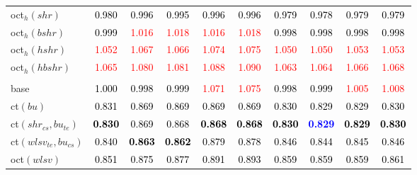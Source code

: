 \begin{tabular}[t]{>{\centering\arraybackslash}m{2.5cm}ccccccccc}
oct$_h(shr)$ & \textcolor{black}{0.980} & \textcolor{black}{0.996} & \textcolor{black}{0.995} & \textcolor{black}{0.996} & \textcolor{black}{0.996} & \textcolor{black}{0.979} & \textcolor{black}{0.978} & \textcolor{black}{0.979} & \textcolor{black}{0.979}\\
oct$_h(bshr)$ & \textcolor{black}{0.999} & \textcolor{red}{1.016} & \textcolor{red}{1.018} & \textcolor{red}{1.016} & \textcolor{red}{1.018} & \textcolor{black}{0.998} & \textcolor{black}{0.998} & \textcolor{black}{0.998} & \textcolor{black}{0.998}\\
oct$_h(hshr)$ & \textcolor{red}{1.052} & \textcolor{red}{1.067} & \textcolor{red}{1.066} & \textcolor{red}{1.074} & \textcolor{red}{1.075} & \textcolor{red}{1.050} & \textcolor{red}{1.050} & \textcolor{red}{1.053} & \textcolor{red}{1.053}\\
oct$_h(hbshr)$ & \textcolor{red}{1.065} & \textcolor{red}{1.080} & \textcolor{red}{1.081} & \textcolor{red}{1.088} & \textcolor{red}{1.090} & \textcolor{red}{1.063} & \textcolor{red}{1.064} & \textcolor{red}{1.066} & \textcolor{red}{1.068}\\
\addlinespace[0.3em]
\multicolumn{10}{c}{\textbf{$k = 2$}}\\
base & \textcolor{black}{1.000} & \textcolor{black}{0.998} & \textcolor{black}{0.999} & \textcolor{red}{1.071} & \textcolor{red}{1.075} & \textcolor{black}{0.998} & \textcolor{black}{0.999} & \textcolor{red}{1.005} & \textcolor{red}{1.008}\\
ct$(bu)$ & \textcolor{black}{0.831} & \textcolor{black}{0.869} & \textcolor{black}{0.869} & \textcolor{black}{0.869} & \textcolor{black}{0.869} & \textcolor{black}{0.830} & \textcolor{black}{0.829} & \textcolor{black}{0.829} & \textcolor{black}{0.830}\\
ct$(shr_{cs}, bu_{te})$ & \textcolor{black}{\textbf{0.830}} & \textcolor{black}{0.869} & \textcolor{black}{0.868} & \textcolor{black}{\textbf{0.868}} & \textcolor{black}{\textbf{0.868}} & \textcolor{black}{\textbf{0.830}} & \textcolor{blue}{\textbf{0.829}} & \textcolor{black}{\textbf{0.829}} & \textcolor{black}{\textbf{0.830}}\\
ct$(wlsv_{te}, bu_{cs})$ & \textcolor{black}{0.840} & \textcolor{black}{\textbf{0.863}} & \textcolor{black}{\textbf{0.862}} & \textcolor{black}{0.879} & \textcolor{black}{0.878} & \textcolor{black}{0.846} & \textcolor{black}{0.844} & \textcolor{black}{0.845} & \textcolor{black}{0.846}\\
oct$(wlsv)$ & \textcolor{black}{0.851} & \textcolor{black}{0.875} & \textcolor{black}{0.877} & \textcolor{black}{0.891} & \textcolor{black}{0.893} & \textcolor{black}{0.859} & \textcolor{black}{0.859} & \textcolor{black}{0.859} & \textcolor{black}{0.861}\\

\end{tabular}
